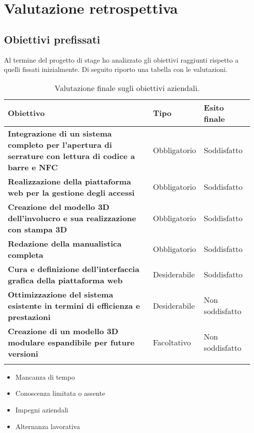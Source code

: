 
\chapter{Valutazione retrospettiva}
\label{cap:valutazione-retrospettiva}

\section{Obiettivi prefissati}
Al termine del progetto di stage ho analizzato gli obiettivi raggiunti rispetto a quelli fissati inizialmente. Di seguito riporto una tabella con le valutazioni.

\renewcommand{\arraystretch}{1.4}
\begin{longtable}{|p{7cm}|p{2.5cm}|p{3cm}|}
\hline
\textbf{Obiettivo} & \textbf{Tipo} & \textbf{Esito finale} \\ 
\hline
\textbf{Integrazione di un sistema completo per l'apertura di serrature con lettura di codice a barre e NFC} & Obbligatorio & Soddisfatto \\ 
\hline
\textbf{Realizzazione della piattaforma web per la gestione degli accessi} & Obbligatorio & Soddisfatto \\ 
\hline
\textbf{Creazione del modello 3D dell'involucro e sua realizzazione con stampa 3D} & Obbligatorio & Soddisfatto \\ 
\hline
\textbf{Redazione della manualistica completa} & Obbligatorio & Soddisfatto \\ 
\hline
\textbf{Cura e definizione dell'interfaccia grafica della piattaforma web} & Desiderabile & Soddisfatto \\ 
\hline
\textbf{Ottimizzazione del sistema esistente in termini di efficienza e prestazioni} & Desiderabile & Non soddisfatto \\ 
\hline
\textbf{Creazione di un modello 3D modulare espandibile per future versioni} & Facoltativo & Non soddisfatto \\ 
\hline
\caption{Valutazione finale sugli obiettivi aziendali.}
\end{longtable}

\begin{itemize}
\item Mancanza di tempo
\item Conoscenza limitata o assente
\item Impegni aziendali
\item Alternanza lavorativa
\end{itemize}

